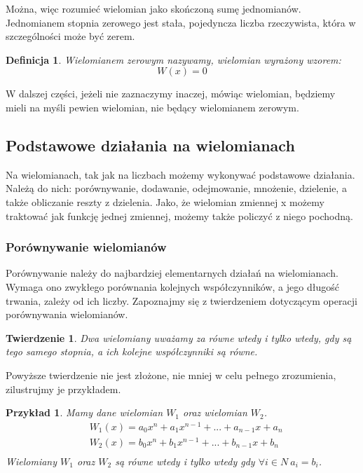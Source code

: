 \documentclass[twoside,a4paper]{book}
\newtheorem{theorem}{Twierdzenie}
\newtheorem{definition}{Definicja}
\newtheorem{example}{Przykład}
\begin{document}
Można, więc rozumieć wielomian jako skończoną sumę jednomianów.
Jednomianem stopnia zerowego jest stała, pojedyncza liczba rzeczywista, która w szczególności może być zerem.

\begin{definition}
	Wielomianem zerowym nazywamy, wielomian wyrażony wzorem:
	\begin{equation}
		W(x) = 0
	\end{equation}
\end{definition}

W dalszej części, jeżeli nie zaznaczymy inaczej, mówiąc wielomian, będziemy mieli na myśli pewien wielomian, nie będący wielomianem zerowym.

\subsection{Podstawowe działania na wielomianach}

Na wielomianach, tak jak na liczbach możemy wykonywać podstawowe działania. Należą do nich: porównywanie, dodawanie, odejmowanie, mnożenie, dzielenie, a także obliczanie reszty z dzielenia. Jako, że wielomian zmiennej x możemy traktować jak funkcję jednej zmiennej, możemy także policzyć z niego pochodną.

\subsubsection{Porównywanie wielomianów}

Porównywanie należy do najbardziej elementarnych działań na wielomianach. Wymaga ono zwykłego porównania kolejnych współczynników, a jego długość trwania, zależy od ich liczby. Zapoznajmy się z twierdzeniem dotyczącym operacji porównywania wielomianów.

\begin{theorem}
	Dwa wielomiany uważamy za równe wtedy i tylko wtedy, gdy są tego samego stopnia, a ich kolejne współczynniki są równe.
\end{theorem}

Powyższe twierdzenie nie jest złożone, nie mniej w celu pełnego zrozumienia, zilustrujmy je przykładem. 

\begin{example}
	Mamy dane wielomian $W_1$ oraz wielomian $W_2$.
	\begin{equation}
		\begin{split}
			&W_1(x) = a_0x^n + a_1x^{n-1} + ... + a_{n-1}x + a_n \\
			&W_2(x) = b_0x^n + b_1x^{n-1} + ... + b_{n-1}x + b_n \\
		\end{split}
	\end{equation}
	Wielomiany $W_1$ oraz $W_2 $ są równe wtedy i tylko wtedy gdy
	$\forall{i\in N}\ a_i = b_i$.
\end{example}
\end{document}
